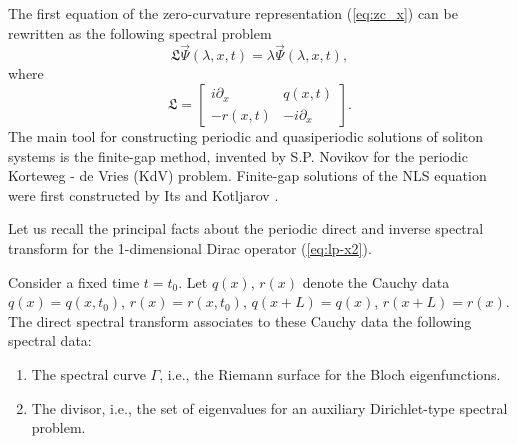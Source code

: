 \documentclass[12pt]{article}
\newcommand{\LG}{\mathfrak L}
\begin{document}
The first equation of the zero-curvature representation (\ref{eq:zc_x}) can be rewritten as the following spectral problem
\begin{equation}
\label{eq:lp-x2}
\LG\vec\Psi(\lambda,x,t)=\lambda \vec\Psi(\lambda,x,t),
\end{equation}
where 
$$
\LG=\left[ \begin {array}{cc} i\partial_x & q(x,t) \\ -  r(x,t) & -i\partial_x \end {array}\right].
$$
The main tool for constructing periodic and quasiperiodic solutions of soliton systems is the finite-gap method, invented by S.P. Novikov \cite{Novikov} for the periodic Korteweg - de Vries (KdV) problem. Finite-gap solutions of the NLS equation were first constructed by Its and Kotljarov \cite{ItsKotlj}.

Let us recall the principal facts about the periodic direct and inverse spectral transform for the 1-dimensional Dirac operator (\ref{eq:lp-x2}).

Consider a fixed time $t=t_0$. Let $q(x)$, $r(x)$ denote the Cauchy data $q(x)=q(x,t_0)$, $r(x)=r(x,t_0)$, $q(x+L)=q(x)$, $r(x+L)=r(x)$. The direct spectral transform associates to these Cauchy data the following spectral data: 
\begin{enumerate}
\item The spectral curve $\Gamma$, i.e., the Riemann surface for the Bloch eigenfunctions.
\item The divisor, i.e., the set of eigenvalues for an auxiliary Dirichlet-type spectral problem. 
\end{enumerate}
\end{document}
